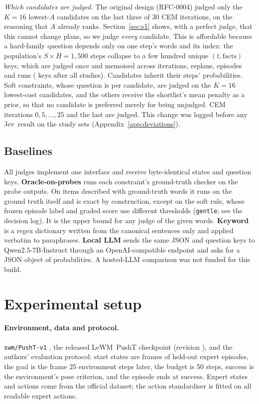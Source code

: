 \documentclass[11pt]{article}
\newcommand{\jev}{Jev}
\newcommand{\lewm}{LeWM}
\begin{document}
\emph{Which candidates are judged.} The original design (RFC-0004) judged only the $K=16$ lowest-$A$ candidates on the last three of 30 CEM iterations, on the reasoning that $A$ already ranks. Section~\ref{sec:s1} shows, with a perfect judge, that this cannot change plans, so we judge \emph{every} candidate. This is affordable because a hard-family question depends only on one step's words and its index: the population's $S\times H=1{,}500$ steps collapse to a few hundred unique $(t,\text{facts})$ keys, which are judged once and memoised across iterations, replans, episodes and runs ( keys after all studies). Candidates inherit their steps' probabilities. Soft constraints, whose question is per candidate, are judged on the $K=16$ lowest-cost candidates, and the others receive the shortlist's mean penalty as a prior, so that no candidate is preferred merely for being unjudged. CEM iterations $0,5,\ldots,25$ and the last are judged. This change was logged before any \jev\ result on the study sets (Appendix~\ref{app:deviations}).

\subsection{Baselines}
All judges implement one interface and receive byte-identical states and question keys. \textbf{Oracle-on-probes} runs each constraint's ground-truth checker on the probe outputs. On items described with ground-truth words it runs on the ground truth itself and is exact by construction, except on the soft rule, whose frozen episode label and graded score use different thresholds (\texttt{gentle}; see the decision log). It is the upper bound for any judge of the given words. \textbf{Keyword} is a regex dictionary written from the canonical sentences only and applied verbatim to paraphrases. \textbf{Local LLM} sends the same JSON and question keys to Qwen2.5-7B-Instruct through an OpenAI-compatible endpoint and asks for a JSON object of probabilities. A hosted-LLM comparison was not funded for this build.

\section{Experimental setup}
\paragraph{Environment, data and protocol.} \texttt{swm/PushT-v1} \citep{swm2026,florence2022ibc,chi2023diffusion}, the released \lewm\ PushT checkpoint (revision \texttt{}), and the authors' evaluation protocol: start states are frames of held-out expert episodes, the goal is the frame 25 environment steps later, the budget is 50 steps, success is the environment's pose criterion, and the episode ends at success. Expert states and actions come from the official dataset; the action standardiser is fitted on all readable expert actions.
\end{document}
